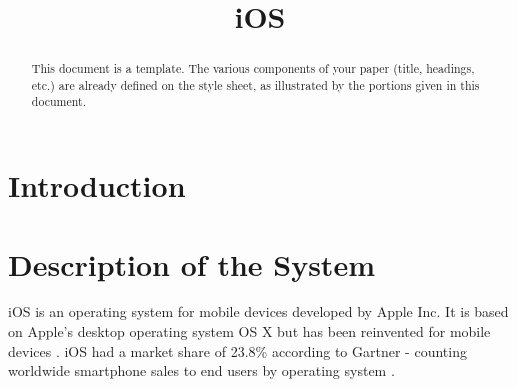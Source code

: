 \documentclass[conference]{IEEEtran}
\begin{document}
\title{iOS}


\author{%
{}
}


\maketitle


\begin{abstract}
This document is a template. The various components of your paper (title, headings, etc.) are already defined on the style sheet, as illustrated by the portions given in this document.
\end{abstract}

\section{Introduction}

\section{Description of the System}
iOS is an operating system for mobile devices developed by Apple Inc. It is based on Apple’s desktop operating system OS X but has been reinvented for mobile devices \cite{apple_ios}. iOS had a market share of 23.8\% according to Gartner - counting worldwide smartphone sales to end users by operating system \cite{gartner_market_share}.
\end{document}
